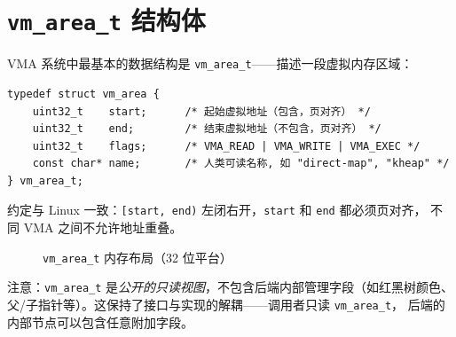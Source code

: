 \section{\texttt{vm\_area\_t} 结构体}

VMA 系统中最基本的数据结构是 \texttt{vm\_area\_t}——描述一段虚拟内存区域：

\begin{lstlisting}[style=cstyle]
typedef struct vm_area {
    uint32_t    start;      /* 起始虚拟地址（包含，页对齐） */
    uint32_t    end;        /* 结束虚拟地址（不包含，页对齐） */
    uint32_t    flags;      /* VMA_READ | VMA_WRITE | VMA_EXEC */
    const char* name;       /* 人类可读名称, 如 "direct-map", "kheap" */
} vm_area_t;
\end{lstlisting}

约定与 Linux 一致：\texttt{[start, end)} 左闭右开，\texttt{start} 和 \texttt{end} 都必须页对齐，
不同 VMA 之间不允许地址重叠。

\begin{figure}[H]
  \centering
  
  \caption{\texttt{vm\_area\_t} 内存布局（32 位平台）}
  \label{fig:vm-area-layout}
\end{figure}

注意：\texttt{vm\_area\_t} 是\emph{公开的只读视图}，不包含后端内部管理字段（如红黑树颜色、
父/子指针等）。这保持了接口与实现的解耦——调用者只读 \texttt{vm\_area\_t}，
后端的内部节点可以包含任意附加字段。


